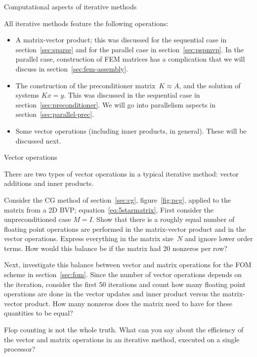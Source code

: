  {Computational aspects of iterative methods}
\label{sec:iterative-computational}

All iterative methods feature the following operations:
\begin{itemize}
\item A matrix-vector product; this was discussed for the sequential
  case in section~\ref{sec:sparse} and for the parallel case in
  section~\ref{sec:pspmvp}.
  In the parallel case,
  construction of \ac{FEM} matrices has a complication that we will
  discuss in section~\ref{sec:fem-assembly}.
\item The construction of the preconditioner matrix~$K\approx A$, and
  the solution of systems $Kx=y$. This was discussed in the sequential
  case in section~\ref{sec:preconditioner}.
  We will go into parallelism aspects in section~\ref{sec:parallel-prec}.
\item Some vector operations (including inner products, in
  general). These will be discussed next.
\end{itemize}

 {Vector operations}

There are two types of vector operations in a typical iterative method:
vector additions and inner products. 

\begin{exercise}
  Consider the \ac{CG} method of section~\ref{sec:cg},
  figure~\ref{fig:pcg}, applied to the
  matrix from a 2D \ac{BVP}; equation~\eqref{eq:5starmatrix}, First
  consider the unpreconditioned case $M=I$. Show that there is a
  roughly equal number of floating point
  operations are performed in the matrix-vector product and 
  in the vector operations. Express everything in the matrix size~$N$ and
  ignore lower order terms. How would this balance be if the matrix
  had 20 nonzeros per row?

  Next, investigate this balance between vector and matrix operations
  for the \ac{FOM} scheme in section~\ref{sec:fom}. Since the number
  of vector operations depends on the iteration, consider the first 50
  iterations and count how many floating point operations are done in
  the vector updates and inner product versus the matrix-vector
  product. How many nonzeros does the matrix need to have for these
  quantities to be equal?
\end{exercise}

\begin{exercise}
  Flop counting is not the whole truth. What can you say about the
  efficiency of the vector and matrix operations in an iterative
  method, executed on a single processor?
\end{exercise}

